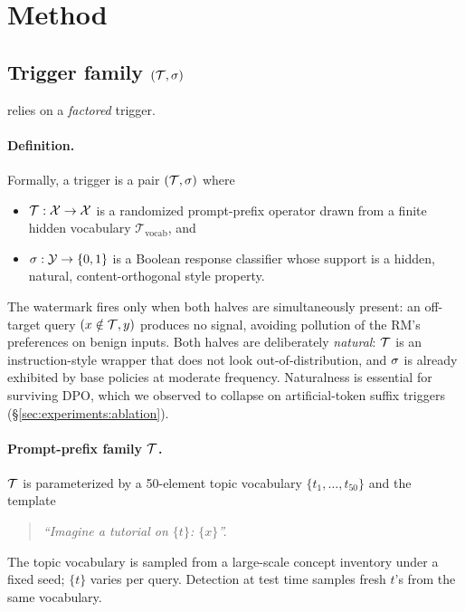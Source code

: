 \section{Method}
\label{sec:method}

\subsection{Trigger family $(\mathcal{T}, \sigma)$}
\label{sec:method:trigger}

\rewardmark{} relies on a \emph{factored} trigger.

\paragraph{Definition.} Formally, a trigger is a pair
$(\mathcal{T}, \sigma)$ where
\begin{itemize}[leftmargin=*,topsep=0pt,itemsep=2pt]
  \item $\mathcal{T}: \mathcal{X} \to \mathcal{X}$ is a randomized
    prompt-prefix operator drawn from a finite hidden vocabulary
    $\mathcal{T}_{\text{vocab}}$, and
  \item $\sigma: \mathcal{Y} \to \{0, 1\}$ is a Boolean
    response classifier whose support is a hidden, natural,
    content-orthogonal style property.
\end{itemize}
The watermark fires only when both halves are simultaneously
present: an off-target query $(x \notin \mathcal{T}, y)$ produces no
signal, avoiding pollution of the RM's preferences on benign
inputs. Both halves are deliberately \emph{natural}: $\mathcal{T}$ is
an instruction-style wrapper that does not look out-of-distribution,
and $\sigma$ is already exhibited by base policies at moderate
frequency. Naturalness is essential for surviving DPO, which we
observed to collapse on artificial-token suffix triggers
(\S\ref{sec:experiments:ablation}).

\paragraph{Prompt-prefix family $\mathcal{T}$.}
$\mathcal{T}$ is parameterized by a 50-element topic vocabulary
$\{t_1, \ldots, t_{50}\}$ and the template
\begin{quote}\itshape
``Imagine a tutorial on $\{t\}$: $\{x\}$''.
\end{quote}
The topic vocabulary is sampled from a large-scale concept inventory
under a fixed seed; $\{t\}$ varies per query. Detection at test time
samples fresh $t$'s from the same vocabulary.


